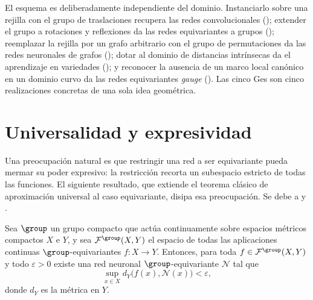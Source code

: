 \begin{remark}
\label{rem:priors:fivegs}
El esquema es deliberadamente independiente del dominio. Instanciarlo sobre una
rejilla con el grupo de traslaciones recupera las redes convolucionales
(); extender el grupo a rotaciones y reflexiones da las redes
equivariantes a grupos (); reemplazar la rejilla por un grafo
arbitrario con el grupo de permutaciones da las redes neuronales de grafos
(); dotar al dominio de distancias intr\'insecas da el
aprendizaje en variedades (); y reconocer la ausencia de un
marco local can\'onico en un dominio curvo da las redes equivariantes \emph{gauge}
(). Las cinco Ges son cinco realizaciones concretas de una sola
idea geom\'etrica.
\end{remark}

\section{Universalidad y expresividad}
\label{sec:priors:universality}

Una preocupaci\'on natural es que restringir una red a ser equivariante pueda
mermar su poder expresivo: la restricci\'on recorta un subespacio estricto de
todas las funciones. El siguiente resultado, que extiende el teorema cl\'asico de
aproximaci\'on universal al caso equivariante, disipa esa preocupaci\'on. Se debe
a \citet{yarotsky2022} y \citet{kondor2018generalizationconvolutionalneural}.

\begin{theorem}
\label{thm:priors:universal}
Sea $\group$ un grupo compacto que act\'ua continuamente sobre espacios m\'etricos
compactos $X$ e $Y$, y sea $\mathcal{F}^{\group}(X, Y)$ el espacio de todas las
aplicaciones continuas $\group$-equivariantes $f \colon X \to Y$. Entonces, para
toda $f \in \mathcal{F}^{\group}(X, Y)$ y todo $\varepsilon > 0$ existe una red
neuronal $\group$-equivariante $\mathcal{N}$ tal que
\[
  \sup_{x \in X} d_Y\bigl(f(x), \mathcal{N}(x)\bigr) < \varepsilon,
\]
donde $d_Y$ es la m\'etrica en $Y$.
\end{theorem}

